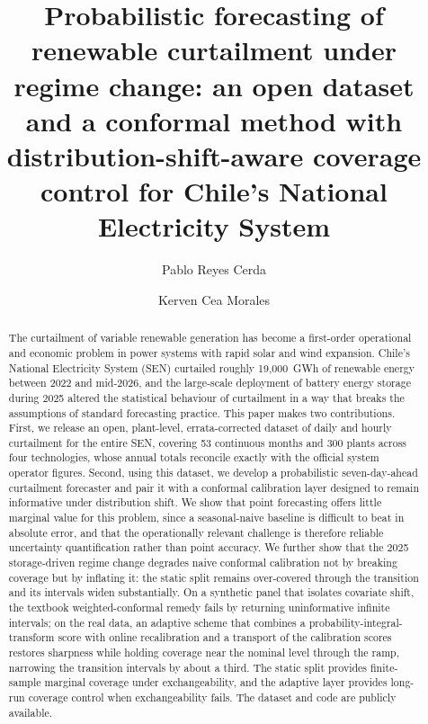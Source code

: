 \documentclass[preprint,3p,times]{elsarticle}
\begin{document}
\begin{frontmatter}

\title{Probabilistic forecasting of renewable curtailment under regime change: an open dataset and a conformal method with distribution-shift-aware coverage control for Chile's National Electricity System}

\author[usach]{Pablo Reyes Cerda}
\author[ubb]{Kerven Cea Morales}


\address[usach]{Mag\'ister en Gesti\'on de la Innovaci\'on y el Emprendimiento Tecnol\'ogico, Universidad de Santiago de Chile, Santiago, Chile}
\address[ubb]{Programa de Doctorado en Matem\'atica Aplicada, Universidad del B\'io-B\'io, Concepci\'on, Chile}

\begin{abstract}
The curtailment of variable renewable generation has become a first-order operational and economic problem in power systems with rapid solar and wind expansion. Chile's National Electricity System (SEN) curtailed roughly 19{,}000~GWh of renewable energy between 2022 and mid-2026, and the large-scale deployment of battery energy storage during 2025 altered the statistical behaviour of curtailment in a way that breaks the assumptions of standard forecasting practice. This paper makes two contributions. First, we release an open, plant-level, errata-corrected dataset of daily and hourly curtailment for the entire SEN, covering 53 continuous months and 300 plants across four technologies, whose annual totals reconcile exactly with the official system operator figures. Second, using this dataset, we develop a probabilistic seven-day-ahead curtailment forecaster and pair it with a conformal calibration layer designed to remain informative under distribution shift. We show that point forecasting offers little marginal value for this problem, since a seasonal-naive baseline is difficult to beat in absolute error, and that the operationally relevant challenge is therefore reliable uncertainty quantification rather than point accuracy. We further show that the 2025 storage-driven regime change degrades naive conformal calibration not by breaking coverage but by inflating it: the static split remains over-covered through the transition and its intervals widen substantially. On a synthetic panel that isolates covariate shift, the textbook weighted-conformal remedy fails by returning uninformative infinite intervals; on the real data, an adaptive scheme that combines a probability-integral-transform score with online recalibration and a transport of the calibration scores restores sharpness while holding coverage near the nominal level through the ramp, narrowing the transition intervals by about a third. The static split provides finite-sample marginal coverage under exchangeability, and the adaptive layer provides long-run coverage control when exchangeability fails. The dataset and code are publicly available.
\end{abstract}


\end{frontmatter}
\end{document}
